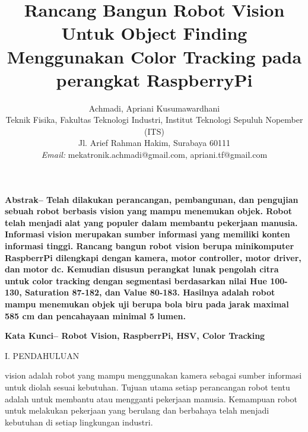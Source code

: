 \documentclass[10pt,journal,compsoc]{IEEEtran}
\begin{document}
 \title{Rancang Bangun Robot Vision Untuk Object Finding Menggunakan Color Tracking pada perangkat RaspberryPi}

 \author{
 Achmadi, Apriani Kusumawardhani\\
 Teknik Fisika, Fakultas Teknologi Industri, Institut Teknologi Sepuluh Nopember (ITS)\\
 Jl. Arief Rahman Hakim, Surabaya 60111\\
 \textit{Email:} mekatronik.achmadi@gmail.com, apriani.tf@gmail.com
 }
 
 
%   
%   
  
  \maketitle
  
 
 \textbf{
 Abstrak--
 Telah dilakukan perancangan, pembangunan, dan pengujian sebuah robot berbasis vision yang mampu menemukan objek. 
 Robot telah menjadi alat yang populer dalam membantu pekerjaan manusia.
 Informasi vision merupakan sumber informasi yang memiliki konten informasi tinggi.
 Rancang bangun robot vision berupa minikomputer RaspberrPi dilengkapi dengan kamera, motor controller, motor driver, dan motor dc.
 Kemudian disusun perangkat lunak pengolah citra untuk color tracking dengan segmentasi berdasarkan nilai Hue 100-130, Saturation 87-182, dan Value 80-183.
 Hasilnya adalah robot mampu menemukan objek uji berupa bola biru pada jarak maximal 585 cm dan pencahayaan minimal 5 lumen.
 }
 
 \textbf{
 Kata Kunci--
 Robot Vision,
 RaspberrPi,
 HSV,
 Color Tracking
 }
 
 \begin{center}
     I. PENDAHULUAN
  \end{center}
  
   vision adalah robot yang mampu menggunakan kamera sebagai sumber informasi untuk diolah sesuai kebutuhan. 
  Tujuan utama setiap perancangan robot tentu adalah untuk membantu atau mengganti pekerjaan manusia. 
  Kemampuan robot untuk melakukan pekerjaan yang berulang dan berbahaya telah menjadi kebutuhan di setiap lingkungan industri.
  
\end{document}
